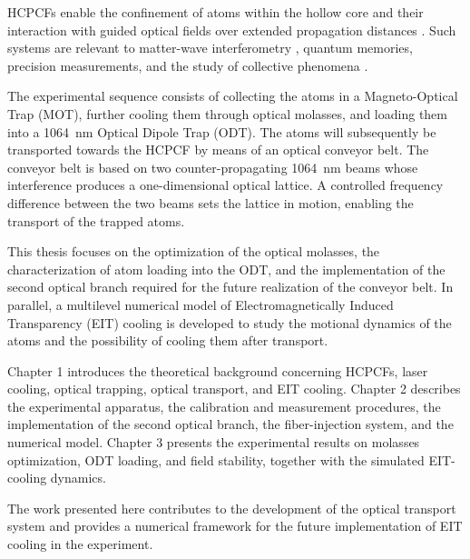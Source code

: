 \documentclass[../../thesis_main.tex]{subfiles}
\begin{document}
HCPCFs enable the confinement of atoms within the hollow core and their interaction with guided optical fields over extended propagation distances \cite{Wang2025}. Such systems are relevant to matter-wave interferometry \cite{Xin:18}, quantum memories, precision measurements, and the study of collective phenomena \cite{Fasser:24,Wang2025}.

The experimental sequence consists of collecting the atoms in a Magneto-Optical Trap (MOT), further cooling them through optical molasses, and loading them into a 1064~nm Optical Dipole Trap (ODT). The atoms will subsequently be transported towards the HCPCF by means of an optical conveyor belt. The conveyor belt is based on two counter-propagating 1064~nm beams whose interference produces a one-dimensional optical lattice. A controlled frequency difference between the two beams sets the lattice in motion, enabling the transport of the trapped atoms.

This thesis focuses on the optimization of the optical molasses, the characterization of atom loading into the ODT, and the implementation of the second optical branch required for the future realization of the conveyor belt. In parallel, a multilevel numerical model of Electromagnetically Induced Transparency (EIT) cooling is developed to study the motional dynamics of the atoms and the possibility of cooling them after transport.

Chapter 1 introduces the theoretical background concerning HCPCFs, laser cooling, optical trapping, optical transport, and EIT cooling. Chapter 2 describes the experimental apparatus, the calibration and measurement procedures, the implementation of the second optical branch, the fiber-injection system, and the numerical model. Chapter 3 presents the experimental results on molasses optimization, ODT loading, and field stability, together with the simulated EIT-cooling dynamics.

The work presented here contributes to the development of the optical transport system and provides a numerical framework for the future implementation of EIT cooling in the experiment.
\end{document}
